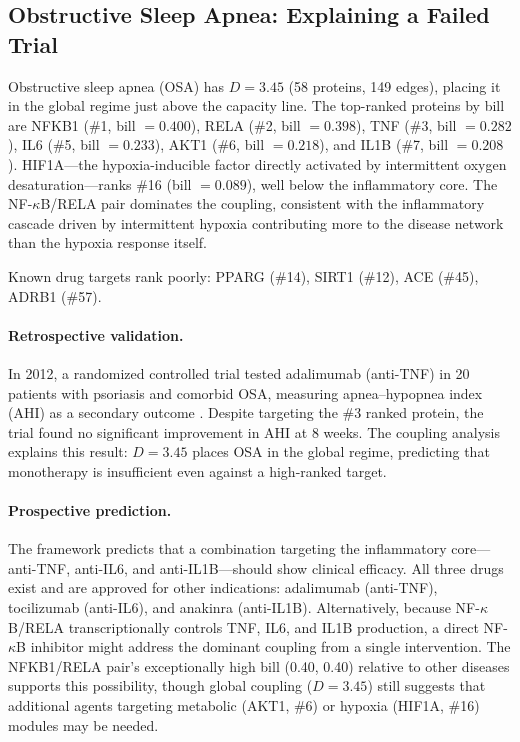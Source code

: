 \documentclass[11pt,a4paper]{article}
\begin{document}
\subsection{Obstructive Sleep Apnea: Explaining a Failed Trial}

Obstructive sleep apnea (OSA) has $D = 3.45$ (58 proteins, 149 edges), placing it in the global regime just above the capacity line. The top-ranked proteins by bill are NFKB1 (\#1, bill $= 0.400$), RELA (\#2, bill $= 0.398$), TNF (\#3, bill $= 0.282$), IL6 (\#5, bill $= 0.233$), AKT1 (\#6, bill $= 0.218$), and IL1B (\#7, bill $= 0.208$). HIF1A---the hypoxia-inducible factor directly activated by intermittent oxygen desaturation---ranks \#16 (bill $= 0.089$), well below the inflammatory core. The NF-$\kappa$B/RELA pair dominates the coupling, consistent with the inflammatory cascade driven by intermittent hypoxia contributing more to the disease network than the hypoxia response itself.

Known drug targets rank poorly: PPARG (\#14), SIRT1 (\#12), ACE (\#45), ADRB1 (\#57).

\paragraph{Retrospective validation.} In 2012, a randomized controlled trial tested adalimumab (anti-TNF) in 20 patients with psoriasis and comorbid OSA, measuring apnea--hypopnea index (AHI) as a secondary outcome \citep{maari2014}. Despite targeting the \#3 ranked protein, the trial found no significant improvement in AHI at 8 weeks. The coupling analysis explains this result: $D = 3.45$ places OSA in the global regime, predicting that monotherapy is insufficient even against a high-ranked target.

\paragraph{Prospective prediction.} The framework predicts that a combination targeting the inflammatory core---anti-TNF, anti-IL6, and anti-IL1B---should show clinical efficacy. All three drugs exist and are approved for other indications: adalimumab (anti-TNF), tocilizumab (anti-IL6), and anakinra (anti-IL1B). Alternatively, because NF-$\kappa$B/RELA transcriptionally controls TNF, IL6, and IL1B production, a direct NF-$\kappa$B inhibitor might address the dominant coupling from a single intervention. The NFKB1/RELA pair's exceptionally high bill (0.40, 0.40) relative to other diseases supports this possibility, though global coupling ($D = 3.45$) still suggests that additional agents targeting metabolic (AKT1, \#6) or hypoxia (HIF1A, \#16) modules may be needed.
\end{document}
